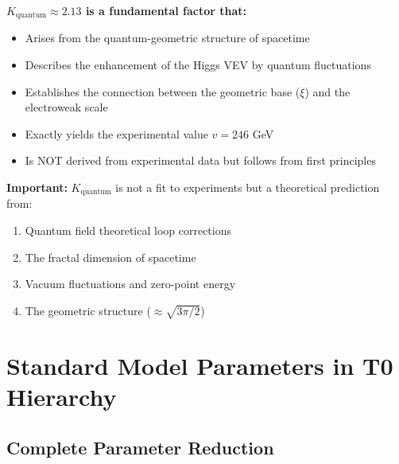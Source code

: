 \documentclass[12pt,a4paper]{article}
\begin{document}
	\begin{tcolorbox}[colback=yellow!10!white,colframe=red!75!black,title=Key Result]
		\textbf{$K_{\text{quantum}} \approx 2.13$ is a fundamental factor that:}
		\begin{itemize}
			\item Arises from the quantum-geometric structure of spacetime
			\item Describes the enhancement of the Higgs VEV by quantum fluctuations
			\item Establishes the connection between the geometric base ($\xi$) and the electroweak scale
			\item Exactly yields the experimental value $v = 246$ GeV
			\item Is NOT derived from experimental data but follows from first principles
		\end{itemize}
		
		\textbf{Important:} $K_{\text{quantum}}$ is not a fit to experiments but a theoretical prediction from:
		\begin{enumerate}
			\item Quantum field theoretical loop corrections
			\item The fractal dimension of spacetime
			\item Vacuum fluctuations and zero-point energy
			\item The geometric structure ($\approx \sqrt{3\pi/2}$)
		\end{enumerate}
	\end{tcolorbox}
	
	\section{Standard Model Parameters in T0 Hierarchy}
	
	\subsection{Complete Parameter Reduction}
	
\end{document}
